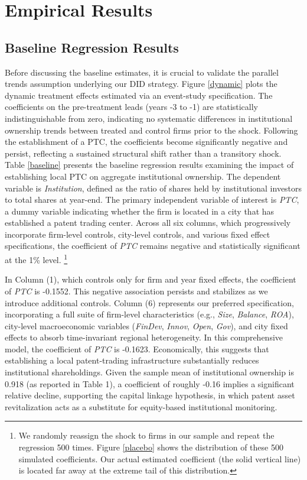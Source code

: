 \documentclass[12pt,a4paper]{article}
\begin{document}
\section{Empirical Results}\label{sec5}
\subsection{Baseline Regression Results}
Before discussing the baseline estimates, it is crucial to validate the parallel trends assumption underlying our DID strategy. Figure \ref{dynamic} plots the dynamic treatment effects estimated via an event-study specification. The coefficients on the pre-treatment leads (years -3 to -1) are statistically indistinguishable from zero, indicating no systematic differences in institutional ownership trends between treated and control firms prior to the shock. Following the establishment of a PTC, the coefficients become significantly negative and persist, reflecting a sustained structural shift rather than a transitory shock. Table \ref{baseline} presents the baseline regression results examining the impact of establishing local PTC on aggregate institutional ownership. The dependent variable is \textit{Institution}, defined as the ratio of shares held by institutional investors to total shares at year-end. The primary independent variable of interest is \textit{PTC}, a dummy variable indicating whether the firm is located in a city that has established a patent trading center. Across all six columns, which progressively incorporate firm-level controls, city-level controls, and various fixed effect specifications, the coefficient of \textit{PTC} remains negative and statistically significant at the 1\% level. \footnote{We randomly reassign the shock to firms in our sample and repeat the regression 500 times. Figure \ref{placebo} shows the distribution of these 500 simulated coefficients. Our actual estimated coefficient (the solid vertical line) is located far away at the extreme tail of this distribution.}

In Column (1), which controls only for firm and year fixed effects, the coefficient of \textit{PTC} is -0.1552. This negative association persists and stabilizes as we introduce additional controls. Column (6) represents our preferred specification, incorporating a full suite of firm-level characteristics (e.g., \textit{Size}, \textit{Balance}, \textit{ROA}), city-level macroeconomic variables (\textit{FinDev}, \textit{Innov}, \textit{Open}, \textit{Gov}), and city fixed effects to absorb time-invariant regional heterogeneity. In this comprehensive model, the coefficient of \textit{PTC} is -0.1623. Economically, this suggests that establishing a local patent-trading infrastructure substantially reduces institutional shareholdings. Given the sample mean of institutional ownership is 0.918 (as reported in Table 1), a coefficient of roughly -0.16 implies a significant relative decline, supporting the capital linkage hypothesis, in which patent asset revitalization acts as a substitute for equity-based institutional monitoring.
\end{document}
